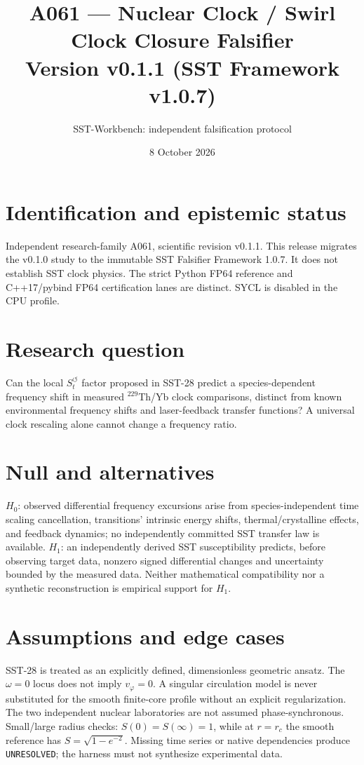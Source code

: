 \documentclass[11pt,a4paper]{article}
\title{A061 --- Nuclear Clock / Swirl Clock Closure Falsifier\\Version v0.1.1 (SST Framework v1.0.7)}
\author{SST-Workbench: independent falsification protocol}
\date{8 October 2026}
\newcommand{\rc}{r_c}
\begin{document}
\maketitle
\section{Identification and epistemic status}
Independent research-family A061, scientific revision v0.1.1. This release migrates the v0.1.0 study to the immutable SST Falsifier Framework 1.0.7. It does not establish SST clock physics. The strict Python FP64 reference and C++17/pybind FP64 certification lanes are distinct. SYCL is disabled in the CPU profile.
\section{Research question}
Can the local $S_t^{\circlearrowleft}$ factor proposed in SST-28 predict a species-dependent frequency shift in measured $^{229}$Th/Yb clock comparisons, distinct from known environmental frequency shifts and laser-feedback transfer functions? A universal clock rescaling alone cannot change a frequency ratio.
\section{Null and alternatives}
$H_0$: observed differential frequency excursions arise from species-independent time scaling cancellation, transitions' intrinsic energy shifts, thermal/crystalline effects, and feedback dynamics; no independently committed SST transfer law is available. $H_1$: an independently derived SST susceptibility predicts, before observing target data, nonzero signed differential changes and uncertainty bounded by the measured data. Neither mathematical compatibility nor a synthetic reconstruction is empirical support for $H_1$.
\section{Assumptions and edge cases}
SST-28 is treated as an explicitly defined, dimensionless geometric ansatz. The $\omega=0$ locus does not imply $v_\varphi=0$. A singular circulation model is never substituted for the smooth finite-core profile without an explicit regularization. The two independent nuclear laboratories are not assumed phase-synchronous. Small/large radius checks: $S(0)=S(\infty)=1$, while at $r=\rc$ the smooth reference has $S=\sqrt{1-e^{-2}}$. Missing time series or native dependencies produce \texttt{UNRESOLVED}; the harness must not synthesize experimental data.
\end{document}
